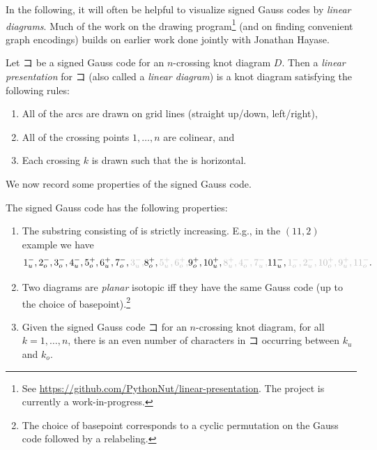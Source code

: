 In the following, it will often be helpful to visualize signed Gauss
codes by \emph{linear diagrams}. Much of the work on the drawing
program\footnote{See
  \href{https://github.com/PythonNut/linear-presentation}{https://github.com/PythonNut/linear-presentation}.
  The project is currently a work-in-progress.} (and on finding
convenient graph encodings) builds on earlier work done jointly with
Jonathan Hayase.
\begin{definition}\label{def:linear-presentation}
  Let $コ$ be a signed Gauss code for an $n$-crossing knot diagram
  $D$. Then a \emph{linear presentation} for $コ$ (also called a
  \emph{linear diagram}) is a knot diagram satisfying the following
  rules:
  \begin{enumerate}
    \item All of the arcs are drawn on grid lines (straight up/down,
      left/right),
    \item All of the crossing points $1, \ldots, n$ are colinear, and
    \item Each crossing $k$ is drawn such that the  is horizontal. \qedhere
  \end{enumerate}
\end{definition}
We now record some properties of the signed Gauss code.
\begin{proposition}
  The signed Gauss code has the following properties:
  \begin{enumerate}[label=(\Roman*)]
    \item The substring consisting of  is strictly increasing. E.g.,
      in the \hyperlink{11-2-example}{$(11,2)$} example we have
      {
      \footnotesize
      \[
      1^-_u, 2^-_o, 3^-_o, 4^-_u, 5^+_o, 6^+_u, 7^-_o,
      {\color{lightgray} 3^-_u,}
      8^+_o,
      {\color{lightgray} 5^+_u, 6^+_o,}
      9^+_o, 10^+_u,
      {\color{lightgray} 8^+_u, 4^-_o, 7^-_u,}
      11^-_u,
      {\color{lightgray} 1^-_o, 2^-_u, 10^+_o, 9^+_u, 11^-_o}.
      \]
      }
    \item Two diagrams are \emph{planar} isotopic iff they have the
      same Gauss code (up to the choice of basepoint).\footnote{The
      choice of basepoint corresponds to a cyclic permutation on the
      Gauss code followed by a relabeling.}
    \item Given the signed Gauss code $コ$ for an $n$-crossing knot
      diagram, for all $k = 1,\ldots, n$, there is an even number of
      characters in $コ$ occurring between $k_u$ and $k_o$.
  \end{enumerate}
\end{proposition}
